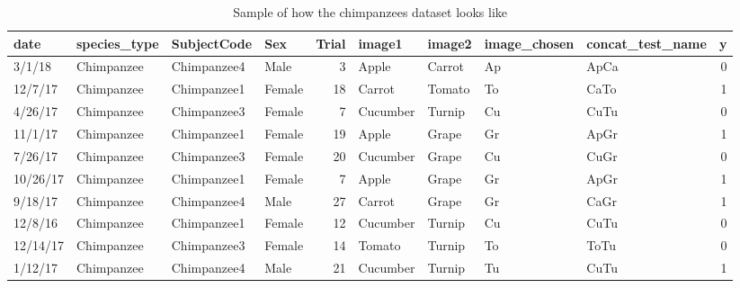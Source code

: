 \documentclass[
]{book}
\newenvironment{Shaded}{\begin{snugshade}}{\end{snugshade}}
\newcommand{\DataTypeTok}[1]{\textcolor[rgb]{0.13,0.29,0.53}{#1}}
\newcommand{\DecValTok}[1]{\textcolor[rgb]{0.00,0.00,0.81}{#1}}
\newcommand{\KeywordTok}[1]{\textcolor[rgb]{0.13,0.29,0.53}{\textbf{#1}}}
\newcommand{\NormalTok}[1]{#1}
\newcommand{\OperatorTok}[1]{\textcolor[rgb]{0.81,0.36,0.00}{\textbf{#1}}}
\newcommand{\StringTok}[1]{\textcolor[rgb]{0.31,0.60,0.02}{#1}}
\begin{document}
\begin{table}

\caption{\label{tab:unnamed-chunk-43}Sample of how the chimpanzees dataset looks like}
\centering
\begin{tabular}[t]{l|l|l|l|r|l|l|l|l|r}
\hline
date & species\_type & SubjectCode & Sex & Trial & image1 & image2 & image\_chosen & concat\_test\_name & y\\
\hline
3/1/18 & Chimpanzee & Chimpanzee4 & Male & 3 & Apple & Carrot & Ap & ApCa & 0\\
\hline
12/7/17 & Chimpanzee & Chimpanzee1 & Female & 18 & Carrot & Tomato & To & CaTo & 1\\
\hline
4/26/17 & Chimpanzee & Chimpanzee3 & Female & 7 & Cucumber & Turnip & Cu & CuTu & 0\\
\hline
11/1/17 & Chimpanzee & Chimpanzee1 & Female & 19 & Apple & Grape & Gr & ApGr & 1\\
\hline
7/26/17 & Chimpanzee & Chimpanzee3 & Female & 20 & Cucumber & Grape & Cu & CuGr & 0\\
\hline
10/26/17 & Chimpanzee & Chimpanzee1 & Female & 7 & Apple & Grape & Gr & ApGr & 1\\
\hline
9/18/17 & Chimpanzee & Chimpanzee4 & Male & 27 & Carrot & Grape & Gr & CaGr & 1\\
\hline
12/8/16 & Chimpanzee & Chimpanzee1 & Female & 12 & Cucumber & Turnip & Cu & CuTu & 0\\
\hline
12/14/17 & Chimpanzee & Chimpanzee3 & Female & 14 & Tomato & Turnip & To & ToTu & 0\\
\hline
1/12/17 & Chimpanzee & Chimpanzee4 & Male & 21 & Cucumber & Turnip & Tu & CuTu & 1\\
\hline
\end{tabular}
\end{table}

\begin{Shaded}
\end{Shaded}
\end{document}
